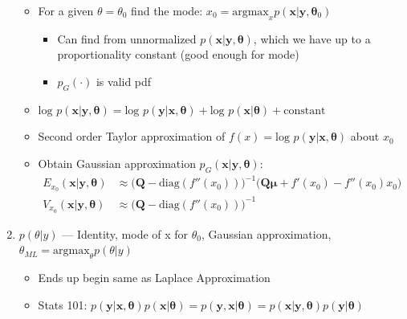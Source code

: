 \documentclass{article}
\begin{document}
\begin{enumerate}
\citep{Lindstrom2014}
      \begin{itemize}
      \item For a given $\theta = \theta_{0}$ find the mode: $x_{0} = \text{argmax}_{x}p(\pmb{x}|\pmb{y},\pmb{\theta}_{0})$
                \begin{itemize}
                \item Can find from unnormalized $p(\pmb{x} | \pmb{y}, \pmb{\theta})$, which we have up to a proportionality constant (good enough for mode)
                \item $p_{G}(\cdot)$ is valid pdf
                \end{itemize}
      \item $\text{log } p(\pmb{x} | \pmb{y}, \pmb{\theta}) = \text{log } p(\pmb{y} | \pmb{x}, \pmb{\theta}) + \text{log } p(\pmb{x} | \pmb{\theta}) + \text{constant}$
      \item Second order Taylor approximation of $f(x) = \text{log } p(\pmb{y} | \pmb{x}, \pmb{\theta})$ about $x_{0}$
      \item Obtain Gaussian approximation $p_{G}(\pmb{x} | \pmb{y}, \pmb{\theta})$:
            \begin{align}
            E_{x_{0}}(\pmb{x|y,\theta}) & \approx \big( \pmb{Q} - \text{diag}(f''(x_{0})) \big)^{-1} \big( \pmb{Q\mu} + f'(x_{0}) - f''(x_{0})x_{0} \big)  \\
            V_{x_{0}}(\pmb{x|y,\theta}) & \approx \big( \pmb{Q} - \text{diag}(f''(x_{0})) \big)^{-1} 
            \end{align}
      \end{itemize}
  
\item $p(\theta|y)$ --- Identity, mode of x for $\theta_{0}$, Gaussian approximation, $
\theta_{ML} = \text{argmax}_{\theta} p(\theta|y)$
      \begin{itemize}
      \item Ends up begin same as \cite{Tierney1986} Laplace Approximation
      \item Stats 101: $p(\pmb{y} | \pmb{x}, \pmb{\theta}) p(\pmb{x} | \pmb{\theta}) =
p(\pmb{y} , \pmb{x} | \pmb{\theta}) = p(\pmb{x} | \pmb{y}, \pmb{\theta}) p(\pmb{y} | \pmb{\theta})$


\end{itemize}
\end{enumerate}
\end{document}
